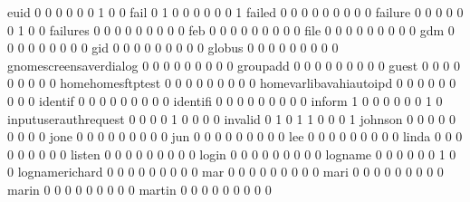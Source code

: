 \documentclass[compress,8pt]{beamer}
\begin{document}
\begin{frame}
\begin{Schunk}
  euid                                       0   0   0   0   0   0   1   0   0
  fail                                       0   1   0   0   0   0   0   0   1
  failed                                     0   0   0   0   0   0   0   0   0
  failure                                    0   0   0   0   0   0   1   0   0
  failures                                   0   0   0   0   0   0   0   0   0
  feb                                        0   0   0   0   0   0   0   0   0
  file                                       0   0   0   0   0   0   0   0   0
  gdm                                        0   0   0   0   0   0   0   0   0
  gid                                        0   0   0   0   0   0   0   0   0
  globus                                     0   0   0   0   0   0   0   0   0
  gnomescreensaverdialog                     0   0   0   0   0   0   0   0   0
  groupadd                                   0   0   0   0   0   0   0   0   0
  guest                                      0   0   0   0   0   0   0   0   0
  homehomesftptest                           0   0   0   0   0   0   0   0   0
  homevarlibavahiautoipd                     0   0   0   0   0   0   0   0   0
  identif                                    0   0   0   0   0   0   0   0   0
  identifi                                   0   0   0   0   0   0   0   0   0
  inform                                     1   0   0   0   0   0   0   1   0
  inputuserauthrequest                       0   0   0   0   1   0   0   0   0
  invalid                                    0   1   0   1   1   0   0   0   1
  johnson                                    0   0   0   0   0   0   0   0   0
  jone                                       0   0   0   0   0   0   0   0   0
  jun                                        0   0   0   0   0   0   0   0   0
  lee                                        0   0   0   0   0   0   0   0   0
  linda                                      0   0   0   0   0   0   0   0   0
  listen                                     0   0   0   0   0   0   0   0   0
  login                                      0   0   0   0   0   0   0   0   0
  logname                                    0   0   0   0   0   0   1   0   0
  lognamerichard                             0   0   0   0   0   0   0   0   0
  mar                                        0   0   0   0   0   0   0   0   0
  mari                                       0   0   0   0   0   0   0   0   0
  marin                                      0   0   0   0   0   0   0   0   0
  martin                                     0   0   0   0   0   0   0   0   0

\end{Schunk}
\end{frame}
\end{document}
